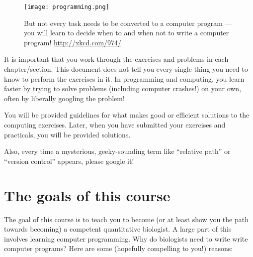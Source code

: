 \begin{wrapfigure}[13]{c}{0.5\textwidth}
   \texttt{[image: programming.png]}
	\caption{\label{fig:Programming} But not every task needs to be 
	converted to a computer program --- you will learn to decide when to 
	and when not to write a computer program! \url{http://xkcd.com/974/}} 
\end{wrapfigure}
It is important that you work through the exercises and problems in 
each chapter/section. This document does not tell you every single 
thing you need to know to perform the exercises in it. In programming 
and computing, you learn faster by trying to solve problems (including 
computer crashes!) on your own, often by liberally googling the problem! 

You will be provided guidelines for what makes good or efficient 
solutions to the computing exercises. Later, when you have submitted 
your exercises and practicals, you will be provided solutions. 

Also, every time a mysterious, geeky-sounding term like ``relative 
path'' or ``version control'' appears, please google it!

\section{The goals of this course}

The goal of this course is to teach you to become (or at least show you 
the path towards becoming) a competent quantitative biologist. A large 
part of this involves learning computer programming. Why do biologists 
need to write write computer programs? Here are some (hopefully 
compelling to you!) reasons:

